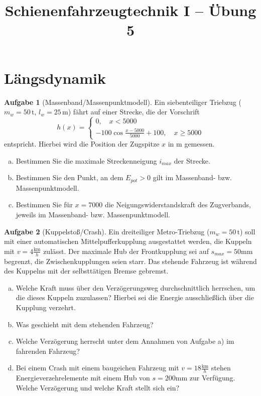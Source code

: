 \documentclass[10pt,a4paper,headsepline,smallheadings]{scrartcl}
\title{Schienenfahrzeugtechnik I  -- \"Ubung 5}
\date{}
\theoremstyle{definition}
\newtheorem{aufgabe}{Aufgabe}
\begin{document}
\thispagestyle{empty}
\maketitle
\vspace{-2cm}

\section*{L\"angsdynamik}

\begin{aufgabe}[Massenband/Massenpunktmodell]
Ein siebenteiliger Triebzug ($m_{w} = 50 \, \mathrm{t}$, $l_{w} = 25 \, \mathrm{m}$) f\"ahrt auf einer Strecke, die der Vorschrift 
 \begin{equation*}
h(x) = 
\begin{cases}
 0, \quad x < 5000 \\
 - 100 \cos \frac{x-5000}{5000} + 100, \quad x \geq 5000
\end{cases}
\end{equation*}
entspricht. Hierbei wird die Position der Zugspitze $x$ in $\mathrm{m}$ gemessen.
\begin{enumerate}[a)]
\item Bestimmen Sie die maximale Streckenneigung $i_{max}$ der Strecke.
\item Bestimmen Sie den Punkt, an dem $E_{pot} > 0$ gilt im Massenband- bzw. Massenpunktmodell.
\item Bestimmen Sie f\"ur $x = 7000$ die Neigungswiderstandskraft des Zugverbands, jeweils im Massenband- bzw. Massenpunktmodell.
\end{enumerate}

\end{aufgabe}
\vspace{.5cm}
\begin{aufgabe}[Kuppelsto{\ss}/Crash]
Ein dreiteiliger Metro-Triebzug ($m_{w} = 50 \, \mathrm{t}$) soll mit einer automatischen Mittelpufferkupplung ausgestattet werden, die Kuppeln mit $v = 4 \frac{\mathrm{km}}{{h}}$ zul\"asst. Der maximale Hub der Frontkupplung sei auf $s_{max} = 50 \mathrm{mm}$ begrenzt, die Zwischenkupplungen seien starr. Das stehende Fahrzeug ist w\"ahrend des Kuppelns mit der selbstt\"atigen Bremse gebremst.
\begin{enumerate}[a)]
\item Welche Kraft muss \"uber den Verz\"ogerungsweg durchschnittlich herrschen, um die dieses Kuppeln zuzulassen? Hierbei sei die Energie ausschlie{\ss}lich \"uber die Kupplung verzehrt.
\item Was geschieht mit dem stehenden Fahrzeug?
\item Welche Verz\"ogerung herrscht unter dem Annahmen von Aufgabe a) im fahrenden Fahrzeug?
\item Bei einem Crash mit einem baugeichen Fahrzeug mit $v = 18 \frac{\mathrm{km}}{{h}}$ stehen Energieverzehrelemente mit einem Hub von $s = 200 \mathrm{mm}$ zur Verf\"ugung. Welche Verz\"ogerung und welche Kraft stellt sich ein?
\end{enumerate}
\end{aufgabe}
\end{document}
